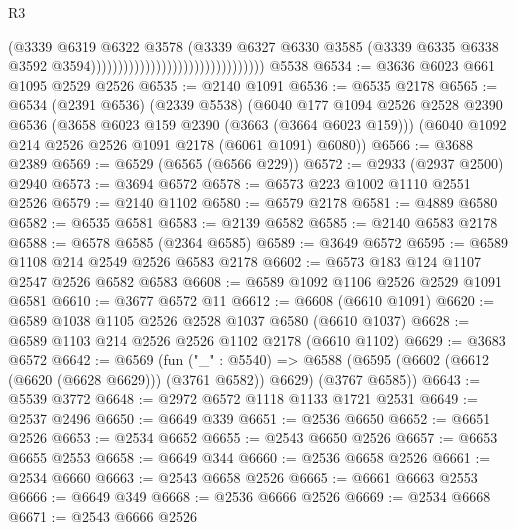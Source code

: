 \begin{lexlean}{R3}
\begin{coremodule}
                                                              (@3339
                                                                @6319
                                                                @6322
                                                                @3578
                                                                (@3339
                                                                  @6327
                                                                  @6330
                                                                  @3585
                                                                  (@3339
                                                                    @6335
                                                                    @6338
                                                                    @3592
                                                                    @3594))))))))))))))))))))))))))))))))
    @5538
@6534 := @3636 @6023 @661 @1095 @2529 @2526
@6535 := @2140 @1091
@6536 := @6535 @2178
@6565 := @6534
    (@2391 @6536)
    (@2339 @5538)
    (@6040
      @177
      @1094
      @2526
      @2528
      @2390
      @6536
      (@3658 @6023 @159 @2390 (@3663 (@3664 @6023 @159)))
      (@6040 @1092 @214 @2526 @2526 @1091 @2178 (@6061 @1091) @6080))
@6566 := @3688 @2389
@6569 := @6529 (@6565 (@6566 @229))
@6572 := @2933 (@2937 @2500) @2940
@6573 := @3694 @6572
@6578 := @6573 @223 @1002 @1110 @2551 @2526
@6579 := @2140 @1102
@6580 := @6579 @2178
@6581 := @4889 @6580
@6582 := @6535 @6581
@6583 := @2139 @6582
@6585 := @2140 @6583 @2178
@6588 := @6578 @6585 (@2364 @6585)
@6589 := @3649 @6572
@6595 := @6589 @1108 @214 @2549 @2526 @6583 @2178
@6602 := @6573 @183 @124 @1107 @2547 @2526 @6582 @6583
@6608 := @6589 @1092 @1106 @2526 @2529 @1091 @6581
@6610 := @3677 @6572 @11
@6612 := @6608 (@6610 @1091)
@6620 := @6589 @1038 @1105 @2526 @2528 @1037 @6580 (@6610 @1037)
@6628 := @6589 @1103 @214 @2526 @2526 @1102 @2178 (@6610 @1102)
@6629 := @3683 @6572
@6642 := @6569
    (fun ("_" : @5540) =>
    @6588 (@6595 (@6602 (@6612 (@6620 (@6628 @6629))) (@3761 @6582)) @6629) (@3767 @6585))
@6643 := @5539 @3772
@6648 := @2972 @6572 @1118 @1133 @1721 @2531
@6649 := @2537 @2496
@6650 := @6649 @339
@6651 := @2536 @6650
@6652 := @6651 @2526
@6653 := @2534 @6652
@6655 := @2543 @6650 @2526
@6657 := @6653 @6655 @2553
@6658 := @6649 @344
@6660 := @2536 @6658 @2526
@6661 := @2534 @6660
@6663 := @2543 @6658 @2526
@6665 := @6661 @6663 @2553
@6666 := @6649 @349
@6668 := @2536 @6666 @2526
@6669 := @2534 @6668
@6671 := @2543 @6666 @2526

\end{coremodule}
\end{lexlean}
